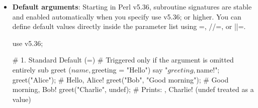 \documentclass{report}
\begin{document}
\begin{itemize}
\begin{perlcode}
                # Flatten (join) two hashes into one big list an put that in a hash
                my %
            \end{perlcode}
            \bigbreak \noindent 
            \begin{perlcode}
                my @colours = qw/red blue white green pink/;
                my @chosen = qw/red white green/;

                print_unchosen(@chosen, @colours);

                sub print_unchosen {
                    my (@chosen, @colours) = @_;

                    # at this point @chosen contains:
                    # (red white green red blue white green pink)
                    # and @colours contains () - the empty list.
                }
            \end{perlcode}
            \bigbreak \noindent 
            We can avoid this problem by using references:
            \bigbreak \noindent 
            \begin{perlcode}
                my @colours = qw/red blue white green pink/;
                my @chosen = qw/red white green/;
                print_unchosen(\@chosen, \@colours);
                sub print_unchosen {
                    my ($chosen, $colours) = @_;
                    my @chosen = @$chosen;
                    my @colours = @$colours;
                    # at this point @chosen contains:
                    # (red white green)
                    # and @colours contains (red blue white green pink)
                }
            \end{perlcode}
        \item \textbf{Default arguments}: Starting in Perl v5.36, subroutine signatures are stable and enabled automatically when you specify use v5.36; or higher. You can define default values directly inside the parameter list using =, //=, or ||=.
            \bigbreak \noindent 
            \begin{perlcode}
                use v5.36;

                # 1. Standard Default (=)
                # Triggered only if the argument is omitted entirely
                sub greet ($name, $greeting = "Hello") {
                    say "$greeting, $name!";
                }
                greet("Alice");           # Hello, Alice!
                greet("Bob", "Good morning"); # Good morning, Bob!
                greet("Charlie", undef);  # Prints: , Charlie! (undef treated as a value)


\end{perlcode}
\end{itemize}
\end{document}

